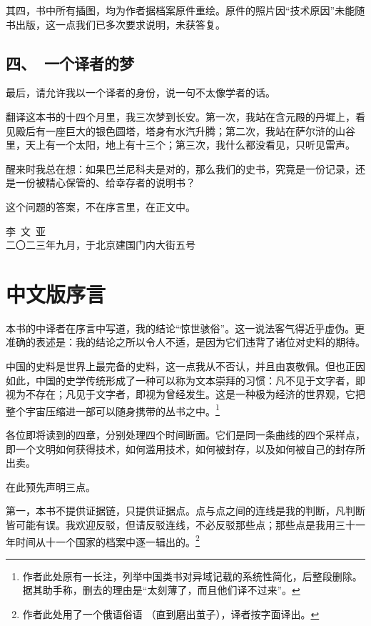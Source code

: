 其四，书中所有插图，均为作者据档案原件重绘。原件的照片因“技术原因”未能随书出版，这一点我们已多次要求说明，未获答复。

\section*{四、\ 一个译者的梦}

最后，请允许我以一个译者的身份，说一句不太像学者的话。

翻译这本书的十四个月里，我三次梦到长安。第一次，我站在含元殿的丹墀上，看见殿后有一座巨大的银色圆塔，塔身有水汽升腾；第二次，我站在萨尔浒的山谷里，天上有一个太阳，地上有十三个；第三次，我什么都没看见，只听见雷声。

醒来时我总在想：如果巴兰尼科夫是对的，那么我们的史书，究竟是一份记录，还是一份被精心保管的、给幸存者的说明书？

这个问题的答案，不在序言里，在正文中。

\vspace{12mm}
\begin{flushright}
{\small 李\ 文\ 亚}\\[2pt]
{\footnotesize\color{pencil} 二〇二三年九月，于北京建国门内大街五号}
\end{flushright}

\clearpage
\chapter*{中文版序言}

本书的中译者在序言中写道，我的结论“惊世骇俗”。这一说法客气得近乎虚伪。更准确的表述是：我的结论之所以令人不适，是因为它们违背了诸位对史料的期待。

中国的史料是世界上最完备的史料，这一点我从不否认，并且由衷敬佩。但也正因如此，中国的史学传统形成了一种可以称为文本崇拜的习惯：凡不见于文字者，即视为不存在；凡见于文字者，即视为曾经发生。这是一种极为经济的世界观，它把整个宇宙压缩进一部可以随身携带的丛书之中。\footnote{作者此处原有一长注，列举中国类书对异域记载的系统性简化，后整段删除。据其助手称，删去的理由是“太刻薄了，而且他们译不过来”。}

各位即将读到的四章，分别处理四个时间断面。它们是同一条曲线的四个采样点，即一个文明如何获得技术，如何滥用技术，如何被封存，以及如何被自己的封存所出卖。

在此预先声明三点。

第一，本书不提供证据链，只提供证据点。点与点之间的连线是我的判断，凡判断皆可能有误。我欢迎反驳，但请反驳连线，不必反驳那些点；那些点是我用三十一年时间从十一个国家的档案中逐一辑出的。\footnote{作者此处用了一个俄语俗语 （直到磨出茧子），译者按字面译出。}

